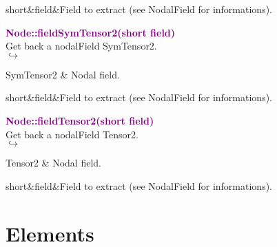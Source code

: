 \begin{tcolorbox}[width=\textwidth,myArgs,tabularx={ll|R}]
short&field&Field to extract (see NodalField for informations).
\end{tcolorbox}



\textcolor{purple}{\textbf{Node::fieldSymTensor2(short field)}}\label{Node::fieldSymTensor2(short field)}\\
Get back a nodalField SymTensor2.\\ \hspace*{5mm}$\hookrightarrow$
\vspace*{-2em}\begin{tcolorbox}[grow to left by=-1cm, width=\textwidth-1cm,myArgs,tabularx={l|R}]
SymTensor2 & Nodal field.
\end{tcolorbox}

\begin{tcolorbox}[width=\textwidth,myArgs,tabularx={ll|R}]
short&field&Field to extract (see NodalField for informations).
\end{tcolorbox}


\textcolor{purple}{\textbf{Node::fieldTensor2(short field)}}\label{Node::fieldTensor2(short field)}\\
Get back a nodalField Tensor2.\\ \hspace*{5mm}$\hookrightarrow$
\vspace*{-2em}\begin{tcolorbox}[grow to left by=-1cm, width=\textwidth-1cm,myArgs,tabularx={l|R}]
Tensor2 & Nodal field.
\end{tcolorbox}

\begin{tcolorbox}[width=\textwidth,myArgs,tabularx={ll|R}]
short&field&Field to extract (see NodalField for informations).
\end{tcolorbox}


\section{Elements}

